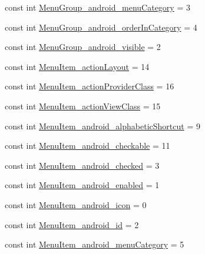 \begin{DoxyCompactItemize}
\item 
const int \mbox{\hyperlink{class_f_w_p_s___app_1_1_droid_1_1_resource_1_1_styleable_a6384e6e0b819785b6885c56827a3c2fc}{Menu\+Group\+\_\+android\+\_\+menu\+Category}} = 3
\item 
const int \mbox{\hyperlink{class_f_w_p_s___app_1_1_droid_1_1_resource_1_1_styleable_ab20a6af2699a3ff38fed29b31fb0274f}{Menu\+Group\+\_\+android\+\_\+order\+In\+Category}} = 4
\item 
const int \mbox{\hyperlink{class_f_w_p_s___app_1_1_droid_1_1_resource_1_1_styleable_adcf69925373bab8706d99b69cda6028a}{Menu\+Group\+\_\+android\+\_\+visible}} = 2
\item 
const int \mbox{\hyperlink{class_f_w_p_s___app_1_1_droid_1_1_resource_1_1_styleable_acf269b4d77bd99b6fae68c52a22d8edf}{Menu\+Item\+\_\+action\+Layout}} = 14
\item 
const int \mbox{\hyperlink{class_f_w_p_s___app_1_1_droid_1_1_resource_1_1_styleable_a45e9348566dc24b849c921a98ff62f67}{Menu\+Item\+\_\+action\+Provider\+Class}} = 16
\item 
const int \mbox{\hyperlink{class_f_w_p_s___app_1_1_droid_1_1_resource_1_1_styleable_a432a2f411b2d36c692bb646f57d250a1}{Menu\+Item\+\_\+action\+View\+Class}} = 15
\item 
const int \mbox{\hyperlink{class_f_w_p_s___app_1_1_droid_1_1_resource_1_1_styleable_a94538818eaa11a9fe282091557f5621c}{Menu\+Item\+\_\+android\+\_\+alphabetic\+Shortcut}} = 9
\item 
const int \mbox{\hyperlink{class_f_w_p_s___app_1_1_droid_1_1_resource_1_1_styleable_a72d960149ffd1a86472a28426a0c83b1}{Menu\+Item\+\_\+android\+\_\+checkable}} = 11
\item 
const int \mbox{\hyperlink{class_f_w_p_s___app_1_1_droid_1_1_resource_1_1_styleable_afeea3e681ec202833e3deeccab4761d1}{Menu\+Item\+\_\+android\+\_\+checked}} = 3
\item 
const int \mbox{\hyperlink{class_f_w_p_s___app_1_1_droid_1_1_resource_1_1_styleable_a8c4eff0761f004244adda01da10d12ab}{Menu\+Item\+\_\+android\+\_\+enabled}} = 1
\item 
const int \mbox{\hyperlink{class_f_w_p_s___app_1_1_droid_1_1_resource_1_1_styleable_a01d274bce3dd3b27925413918eac5b0a}{Menu\+Item\+\_\+android\+\_\+icon}} = 0
\item 
const int \mbox{\hyperlink{class_f_w_p_s___app_1_1_droid_1_1_resource_1_1_styleable_a183f9b02f0fdd8da99e8e12e32ab04b2}{Menu\+Item\+\_\+android\+\_\+id}} = 2
\item 
const int \mbox{\hyperlink{class_f_w_p_s___app_1_1_droid_1_1_resource_1_1_styleable_a3e599c30b603049fa6b9c4273fd9bd86}{Menu\+Item\+\_\+android\+\_\+menu\+Category}} = 5

\end{DoxyCompactItemize}

